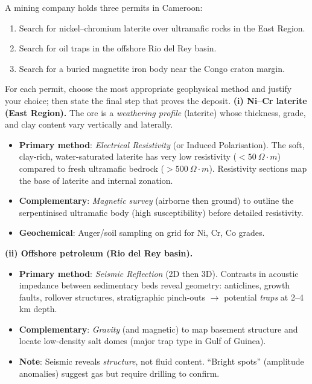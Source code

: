 \documentclass[11pt]{article}
\begin{document}
\begin{exoresolu}
A mining company holds three permits in Cameroon:
\begin{enumerate}
\item Search for nickel--chromium laterite over ultramafic rocks in the East Region.
\item Search for oil traps in the offshore Rio del Rey basin.
\item Search for a buried magnetite iron body near the Congo craton margin.
\end{enumerate}
For each permit, choose the most appropriate geophysical method and justify your choice; then state the final step that proves the deposit.
\tcblower
\textbf{(i) Ni--Cr laterite (East Region).}
The ore is a \emph{weathering profile} (laterite) whose thickness, grade, and clay content vary vertically and laterally.
\begin{itemize}
\item \textbf{Primary method}: \emph{Electrical Resistivity} (or Induced Polarisation). The soft, clay-rich, water-saturated laterite has very low resistivity ($<50\ \Omega\!\cdot\!m$) compared to fresh ultramafic bedrock ($>500\ \Omega\!\cdot\!m$). Resistivity sections map the base of laterite and internal zonation.
\item \textbf{Complementary}: \emph{Magnetic survey} (airborne then ground) to outline the serpentinised ultramafic body (high susceptibility) before detailed resistivity.
\item \textbf{Geochemical}: Auger/soil sampling on grid for Ni, Cr, Co grades.
\end{itemize}

\textbf{(ii) Offshore petroleum (Rio del Rey basin).}
\begin{itemize}
\item \textbf{Primary method}: \emph{Seismic Reflection} (2D then 3D). Contrasts in acoustic impedance between sedimentary beds reveal geometry: anticlines, growth faults, rollover structures, stratigraphic pinch-outs $\rightarrow$ potential \emph{traps} at 2--4 km depth.
\item \textbf{Complementary}: \emph{Gravity} (and magnetic) to map basement structure and locate low-density salt domes (major trap type in Gulf of Guinea).
\item \textbf{Note}: Seismic reveals \emph{structure}, not fluid content. ``Bright spots'' (amplitude anomalies) suggest gas but require drilling to confirm.
\end{itemize}


\end{exoresolu}
\end{document}

